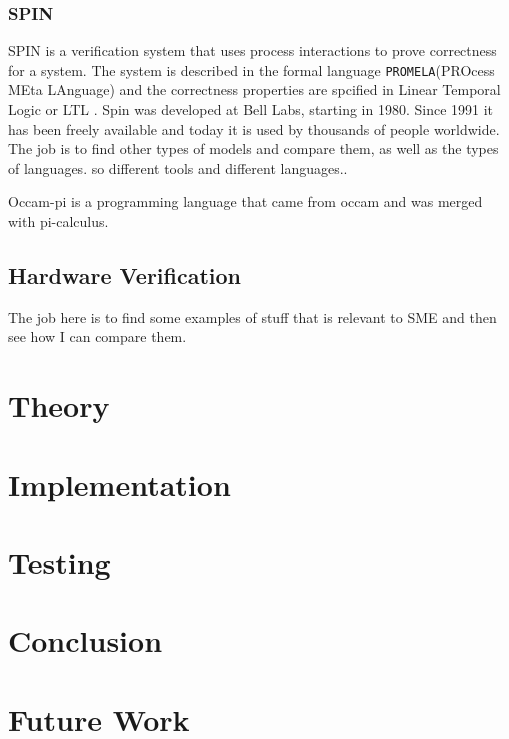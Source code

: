 \documentclass[a4paper]{article}
\begin{document}
\subsubsection*{SPIN}
SPIN  is a verification system that uses process interactions to prove correctness for a system. The system is described in the formal language \texttt{PROMELA}(PROcess MEta LAnguage) and the correctness properties are spcified in Linear Temporal Logic or LTL . Spin was developed at Bell Labs, starting in 1980. Since 1991 it has been freely available and today it is used by thousands of people worldwide.\\
The job is to find other types of models and compare them, as well as the types of languages. so different tools and different languages.. 

Occam-pi is a programming language that came from occam and was merged with pi-calculus. 

\subsection{Hardware Verification}
The job here is to find some examples of stuff that is relevant to SME and then see how I can compare them. 
\section{Theory}

\section{Implementation}

\section{Testing}

\section{Conclusion}

\section{Future Work}


\newpage


\end{document}
